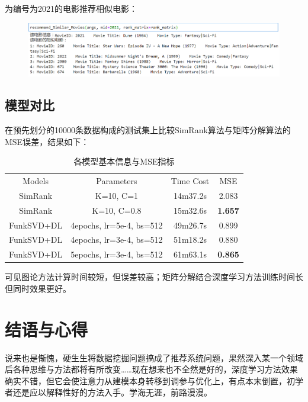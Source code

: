 \begin{spacing}{1.5}
\begin{figure}[h]
\end{figure}\par
\par
为编号为2021的电影推荐相似电影：\par
\begin{figure}[H]
\setlength{\abovecaptionskip}{0.0cm}
\setlength{\belowcaptionskip}{-0.cm}
\centering
\includegraphics[width=1\textwidth]{Figure/svd2.png}
\end{figure}\par
\par
\clearpage


\subsection{模型对比}
在预先划分的10000条数据构成的测试集上比较SimRank算法与矩阵分解算法的MSE误差，结果如下：\par
\begin{table}[h]
\centering
\caption{各模型基本信息与MSE指标}
\label{tab:1}
\begin{tabular}{cccc}
\toprule[2pt]
Models & Parameters & Time Cost & MSE  \\
\noalign{\smallskip}\hline\noalign{\smallskip}
SimRank & K=10, C=1 & 14m37.2s & 2.083 \\
SimRank & K=10, C=0.8& 15m32.6s & \textbf{1.657} \\
\hline\noalign{\smallskip}
FunkSVD+DL & 4epochs, lr=5e-4, bs=512 & 49m26.7s & 0.899 \\
FunkSVD+DL & 4epochs, lr=3e-4, bs=512 & 51m18.2s & 0.880 \\
FunkSVD+DL & 5epochs, lr=3e-4, bs=512 & 61m63.1s & \textbf{0.865} \\
\toprule[2pt]
\end{tabular}
\end{table}
可见图论方法计算时间较短，但误差较高；矩阵分解结合深度学习方法训练时间长但同时效果更好。
\end{spacing}

\section{结语与心得}
\xiaosi\begin{spacing}{1.5}
说来也是惭愧，硬生生将数据挖掘问题搞成了推荐系统问题，果然深入某一个领域后各种思维与方法都将有所改变……现在想来也不全然是好的，深度学习方法效果确实不错，但它会使注意力从建模本身转移到调参与优化上，有点本末倒置，初学者还是应以解释性好的方法入手。学海无涯，前路漫漫。
\end{spacing}


\printbibliography%
